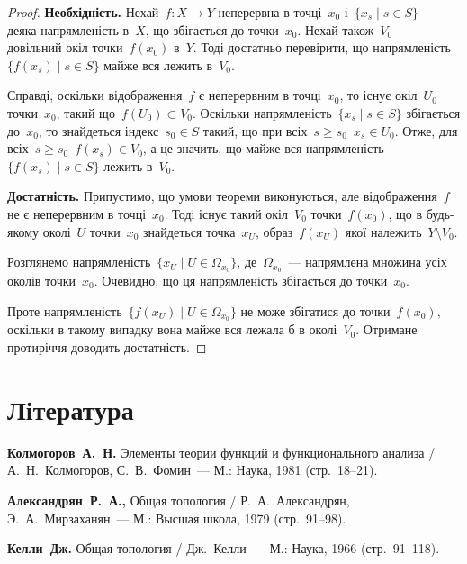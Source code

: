 \begin{proof}
    \textbf{Необхідність.} Нехай~$f: X \to Y$ неперервна в точці~$x_0$ і~$\{x_s \mid s \in S\}$~--- деяка напрямленість в~$X$, що збігається до точки~$x_0$. Нехай також~$V_0$~--- довільний окіл точки~$f(x_0)$ в~$Y$. Тоді достатньо перевірити, що напрямленість~$\{f(x_s) \mid s \in S\}$ майже вся лежить в~$V_0$. 
    
    Справді, оскільки відображення~$f$ є неперервним в точці~$x_0$, то існує окіл~$U_0$ точки~$x_0$, такий що~$f(U_0) \subset V_0$. Оскільки напрямленість~$\{x_s \mid s \in S\}$ збігається до~$x_0$, то знайдеться індекс~$s_0 \in S$ такий, що при всіх~$s \ge s_0$~$x_s \in U_0$. Отже, для всіх~$s \ge s_0$~$f(x_s) \in V_0$, а це значить, що майже вся напрямленість~$\{f(x_s) \mid s \in S\}$ лежить в~$V_0$. 

    \textbf{Достатність.} Припустимо, що умови теореми виконуються, але відображення~$f$ не є неперервним в точці~$x_0$. Тоді існує такий окіл~$V_0$ точки~$f(x_0)$, що в будь-якому околі~$U$ точки~$x_0$ знайдеться точка~$x_U$, образ~$f(x_U)$ якої належить~$Y \setminus V_0$. 

    Розглянемо напрямленість~$\{x_U \mid U \in \Omega_{x_0}\}$, де~$\Omega_{x_0}$~--- напрямлена множина усіх околів точки~$x_0$. Очевидно, що ця напрямленість збігається до точки~$x_0$. 

    Проте напрямленість~$\{ f(x_U) \mid U \in \Omega_{x_0}\}$ не може збігатися до точки~$f(x_0)$, оскільки в такому випадку вона майже вся лежала б в околі~$V_0$. Отримане протиріччя доводить достатність.
\end{proof}

\section{Література}

\begin{enumerate}[label={[\arabic*]}]
\item \textbf{Колмогоров~А.~Н.}
Элементы теории функций и функционального анализа /
А.~Н.~Колмогоров, С.~В.~Фомин~---
М.: Наука, 1981 (стр.~18--21).
\item \textbf{Александрян~Р.~А., }
Общая топология /
Р.~А.~Александрян, Э.~А.~Мирзаханян~---
М.: Высшая школа, 1979 (стр.~91--98).
\item \textbf{Келли~Дж.}
Общая топология /
Дж.~Келли~---
М.: Наука, 1966 (стр.~91--118).
\end{enumerate}
